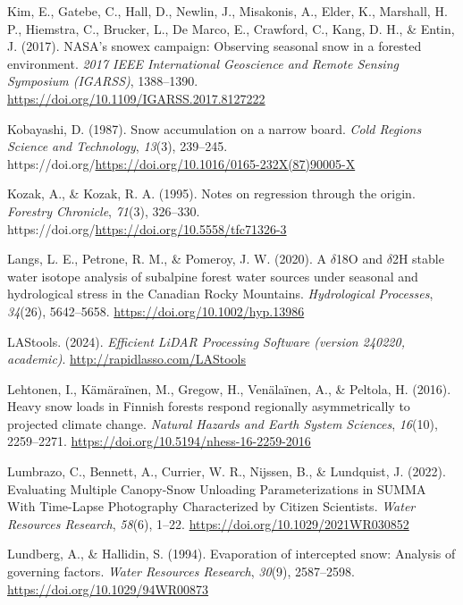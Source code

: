 \documentclass[
  letterpaper,
  DIV=11,
  numbers=noendperiod]{scrartcl}
\newlength{\cslhangindent}
\newenvironment{CSLReferences}[2] %
 {\begin{list}{}{%
  \setlength{\itemindent}{0pt}
  \setlength{\leftmargin}{0pt}
  \setlength{\parsep}{0pt}
  \ifodd #1
   \setlength{\leftmargin}{\cslhangindent}
   \setlength{\itemindent}{-1\cslhangindent}
  \fi
  \setlength{\itemsep}{#2\baselineskip}}}
 {\end{list}}
\begin{document}
\begin{CSLReferences}{1}{0}
Kim, E., Gatebe, C., Hall, D., Newlin, J., Misakonis, A., Elder, K.,
Marshall, H. P., Hiemstra, C., Brucker, L., De Marco, E., Crawford, C.,
Kang, D. H., \& Entin, J. (2017). {NASA's snowex campaign: Observing
seasonal snow in a forested environment}. \emph{2017 IEEE International
Geoscience and Remote Sensing Symposium (IGARSS)}, 1388--1390.
\url{https://doi.org/10.1109/IGARSS.2017.8127222}

Kobayashi, D. (1987). {Snow accumulation on a narrow board}. \emph{Cold
Regions Science and Technology}, \emph{13}(3), 239--245.
https://doi.org/\url{https://doi.org/10.1016/0165-232X(87)90005-X}

Kozak, A., \& Kozak, R. A. (1995). {Notes on regression through the
origin}. \emph{Forestry Chronicle}, \emph{71}(3), 326--330.
https://doi.org/\url{https://doi.org/10.5558/tfc71326-3}

Langs, L. E., Petrone, R. M., \& Pomeroy, J. W. (2020). {A \(\delta\)18O
and \(\delta\)2H stable water isotope analysis of subalpine forest water
sources under seasonal and hydrological stress in the Canadian Rocky
Mountains}. \emph{Hydrological Processes}, \emph{34}(26), 5642--5658.
\url{https://doi.org/10.1002/hyp.13986}

LAStools. (2024). \emph{{Efficient LiDAR Processing Software (version
240220, academic)}}. \url{http://rapidlasso.com/LAStools}

Lehtonen, I., Kämäraïnen, M., Gregow, H., Venälaïnen, A., \& Peltola, H.
(2016). {Heavy snow loads in Finnish forests respond regionally
asymmetrically to projected climate change}. \emph{Natural Hazards and
Earth System Sciences}, \emph{16}(10), 2259--2271.
\url{https://doi.org/10.5194/nhess-16-2259-2016}

Lumbrazo, C., Bennett, A., Currier, W. R., Nijssen, B., \& Lundquist, J.
(2022). {Evaluating Multiple Canopy-Snow Unloading Parameterizations in
SUMMA With Time-Lapse Photography Characterized by Citizen Scientists}.
\emph{Water Resources Research}, \emph{58}(6), 1--22.
\url{https://doi.org/10.1029/2021WR030852}

Lundberg, A., \& Hallidin, S. (1994). {Evaporation of intercepted snow:
Analysis of governing factors}. \emph{Water Resources Research},
\emph{30}(9), 2587--2598. \url{https://doi.org/10.1029/94WR00873}


\end{CSLReferences}
\end{document}
